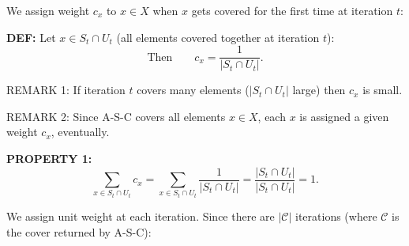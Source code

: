 We assign weight $c_x$ to $x\in X$ when $x$ gets covered for the first time at iteration $t$:
\begin{notesdefinition}
\textbf{DEF:} Let $x\in S_t\cap U_t$ (all elements covered together at iteration $t$):
\[\text{Then}\qquad c_x=\frac1{|S_t\cap U_t|}.\]
\end{notesdefinition}
REMARK 1: If iteration $t$ covers many elements ($|S_t\cap U_t|$ large) then $c_x$ is small.

REMARK 2: Since A-S-C covers all elements $x\in X$, each $x$ is assigned a given weight $c_x$, eventually.

\begin{notesresult}
\textbf{PROPERTY 1:}
\[\sum_{x\in S_t\cap U_t}c_x
=\sum_{x\in S_t\cap U_t}\frac1{|S_t\cap U_t|}
=\frac{|S_t\cap U_t|}{|S_t\cap U_t|}=1.\]
\end{notesresult}
We assign unit weight at each iteration. Since there are $|\mathcal C|$ iterations (where $\mathcal C$ is the cover returned by A-S-C):
